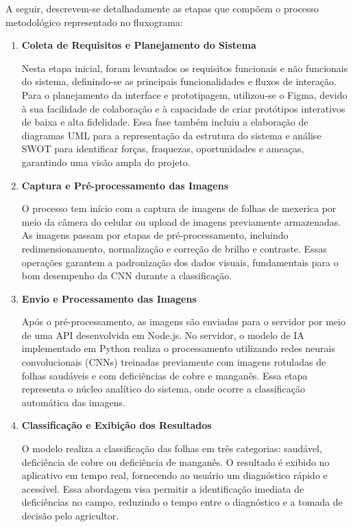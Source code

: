 A seguir, descrevem-se detalhadamente as etapas que compõem o processo metodológico representado no fluxograma:

\begin{enumerate}
\item \textbf{Coleta de Requisitos e Planejamento do Sistema}

Nesta etapa inicial, foram levantados os requisitos funcionais e não funcionais do sistema, definindo-se as principais funcionalidades e fluxos de interação. Para o planejamento da interface e prototipagem, utilizou-se o Figma, devido à sua facilidade de colaboração e à capacidade de criar protótipos interativos de baixa e alta fidelidade. Essa fase também incluiu a elaboração de diagramas UML para a representação da estrutura do sistema e análise SWOT para identificar forças, fraquezas, oportunidades e ameaças, garantindo uma visão ampla do projeto.

\item \textbf{Captura e Pré-processamento das Imagens}

O processo tem início com a captura de imagens de folhas de mexerica por meio da câmera do celular ou upload de imagens previamente armazenadas. As imagens passam por etapas de pré-processamento, incluindo redimensionamento, normalização e correção de brilho e contraste. Essas operações garantem a padronização dos dados visuais, fundamentais para o bom desempenho da CNN durante a classificação.

\item \textbf{Envio e Processamento das Imagens}

Após o pré-processamento, as imagens são enviadas para o servidor por meio de uma API desenvolvida em Node.js. No servidor, o modelo de IA implementado em Python realiza o processamento utilizando redes neurais convolucionais (CNNs) treinadas previamente com imagens rotuladas de folhas saudáveis e com deficiências de cobre e manganês. Essa etapa representa o núcleo analítico do sistema, onde ocorre a classificação automática das imagens.

\item \textbf{Classificação e Exibição dos Resultados}

O modelo realiza a classificação das folhas em três categorias: saudável, deficiência de cobre ou deficiência de manganês. O resultado é exibido no aplicativo em tempo real, fornecendo ao usuário um diagnóstico rápido e acessível. Essa abordagem visa permitir a identificação imediata de deficiências no campo, reduzindo o tempo entre o diagnóstico e a tomada de decisão pelo agricultor.


\end{enumerate}
